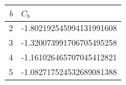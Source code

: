 \begin{tabular}{@{}rl@{}}
\toprule
$b$ & $C_b$ \\
\midrule
2 & -1.802192545994131991608 \\
3 & -1.320073991706705495258 \\
4 & -1.161026465707045412821 \\
5 & -1.082717524532689081388 \\
\bottomrule
\end{tabular}
